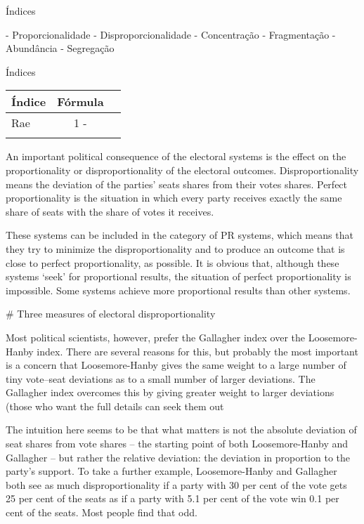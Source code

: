 \begin{frame}{Índices}

- Proporcionalidade
- Disproporcionalidade
- Concentração
- Fragmentação
- Abundância
- Segregação

\end{frame}


\begin{frame}{Índices}
\begin{tabular}{l|cc}
  Índice &  Fórmula& \\
  \hline
  Rae & 1 -  & \\
  & &
\end{tabular}

\end{frame}


An important political consequence of the electoral systems is the effect on the proportionality or disproportionality of the electoral outcomes. Disproportionality means the deviation of the parties’ seats shares from their votes shares. Perfect proportionality is the situation in which every party receives exactly the same share of seats with the share of votes it receives. 


These systems can be included in the category of PR systems, which means that they try to minimize the disproportionality and to produce an outcome that is close to perfect proportionality, as possible. It is obvious that, although these systems ‘seek’ for proportional results, the situation of perfect proportionality is impossible. Some systems achieve more proportional results than other systems.


# Three measures of electoral disproportionality


Most political scientists, however, prefer the Gallagher index over the Loosemore-Hanby index. There are several reasons for this, but probably the most important is a concern that Loosemore-Hanby gives the same weight to a large number of tiny vote–seat deviations as to a small number of larger deviations. The Gallagher index overcomes this by giving greater weight to larger deviations (those who want the full details can seek them out


The intuition here seems to be that what matters is not the absolute deviation of seat shares from vote shares – the starting point of both Loosemore-Hanby and Gallagher – but rather the relative deviation: the deviation in proportion to the party’s support. To take a further example, Loosemore-Hanby and Gallagher both see as much disproportionality if a party with 30 per cent of the vote gets 25 per cent of the seats as if a party with 5.1 per cent of the vote win 0.1 per cent of the seats. Most people find that odd.

